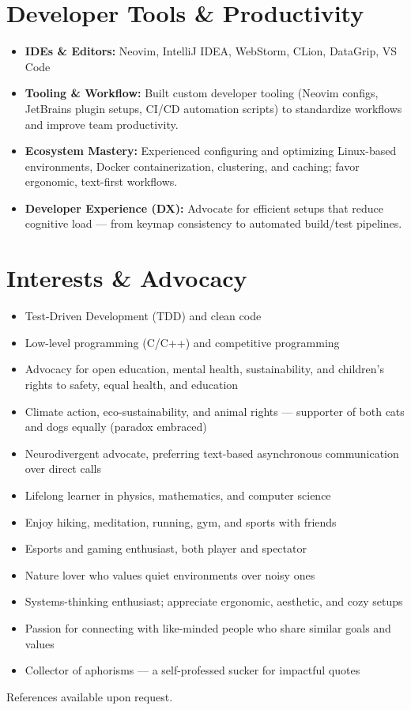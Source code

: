 \documentclass[10pt, a4paper]{article}
\begin{document}
\section*{Developer Tools \& Productivity}
\begin{itemize}
    \item \textbf{IDEs \& Editors:} Neovim, IntelliJ IDEA, WebStorm, CLion, DataGrip, VS Code
    \item \textbf{Tooling \& Workflow:} Built custom developer tooling (Neovim configs, JetBrains plugin setups, CI/CD automation scripts) to standardize workflows and improve team productivity.
    \item \textbf{Ecosystem Mastery:} Experienced configuring and optimizing Linux-based environments, Docker containerization, clustering, and caching; favor ergonomic, text-first workflows.
    \item \textbf{Developer Experience (DX):} Advocate for efficient setups that reduce cognitive load — from keymap consistency to automated build/test pipelines.
\end{itemize}

\section*{Interests \& Advocacy}
\begin{itemize}
    \item Test-Driven Development (TDD) and clean code
    \item Low-level programming (C/C++) and competitive programming
    \item Advocacy for open education, mental health, sustainability, and children’s rights to safety, equal health, and education
    \item Climate action, eco-sustainability, and animal rights — supporter of both cats and dogs equally (paradox embraced)
    \item Neurodivergent advocate, preferring text-based asynchronous communication over direct calls
    \item Lifelong learner in physics, mathematics, and computer science
    \item Enjoy hiking, meditation, running, gym, and sports with friends
    \item Esports and gaming enthusiast, both player and spectator
    \item Nature lover who values quiet environments over noisy ones
    \item Systems-thinking enthusiast; appreciate ergonomic, aesthetic, and cozy setups
    \item Passion for connecting with like-minded people who share similar goals and values
    \item Collector of aphorisms — a self-professed sucker for impactful quotes
\end{itemize}

\vspace{4mm}
\begin{center}
    References available upon request.
\end{center}
\end{document}

